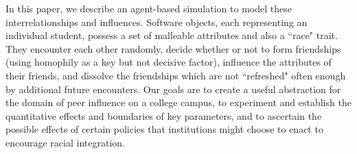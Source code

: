 In this paper, we describe an agent-based simulation to model these
interrelationships and influences. Software objects, each representing an
individual student, possess a set of malleable attributes and also a ``race"
trait. They encounter each other randomly, decide whether or not to form
friendships (using homophily as a key but not decisive factor), influence the
attributes of their friends, and dissolve the friendships which are not
``refreshed" often enough by additional future encounters. Our goals are to
create a useful abstraction for the domain of peer influence on a college
campus, to experiment and establish the quantitative effects and boundaries of
key parameters, and to ascertain the possible effects of certain policies
that institutions might choose to enact to encourage racial integration.
